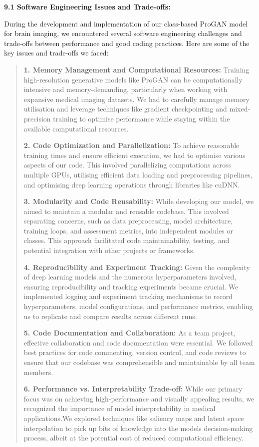\documentclass[
]{article}
\begin{document}
\textbf{9.1 Software Engineering Issues and Trade-offs:}

During the development and implementation of our class-based ProGAN
model for brain imaging, we encountered several software engineering
challenges and trade-offs between performance and good coding practices.
Here are some of the key issues and trade-offs we faced:

\begin{quote}
\textbf{1. Memory Management and Computational Resources:} Training
high-resolution generative models like ProGAN can be computationally
intensive and memory-demanding, particularly when working with expansive
medical imaging datasets. We had to carefully manage memory utilisation
and leverage techniques like gradient checkpointing and mixed-precision
training to optimise performance while staying within the available
computational resources.

\textbf{2. Code Optimization and Parallelization:} To achieve reasonable
training times and ensure efficient execution, we had to optimise
various aspects of our code. This involved parallelizing computations
across multiple GPUs, utilising efficient data loading and preprocessing
pipelines, and optimising deep learning operations through libraries
like cuDNN.

\textbf{3. Modularity and Code Reusability:} While developing our model,
we aimed to maintain a modular and reusable codebase. This involved
separating concerns, such as data preprocessing, model architecture,
training loops, and assessment metrics, into independent modules or
classes. This approach facilitated code maintainability, testing, and
potential integration with other projects or frameworks.

\textbf{4. Reproducibility and Experiment Tracking:} Given the
complexity of deep learning models and the numerous hyperparameters
involved, ensuring reproducibility and tracking experiments became
crucial. We implemented logging and experiment tracking mechanisms to
record hyperparameters, model configurations, and performance metrics,
enabling us to replicate and compare results across different runs.

\textbf{5. Code Documentation and Collaboration:} As a team project,
effective collaboration and code documentation were essential. We
followed best practices for code commenting, version control, and code
reviews to ensure that our codebase was comprehensible and maintainable
by all team members.

\textbf{6. Performance vs. Interpretability Trade-off:} While our
primary focus was on achieving high-performance and visually appealing
results, we recognized the importance of model interpretability in
medical applications.We explored techniques like saliency maps and
latent space interpolation to pick up bits of knowledge into the
model\textquotesingle s decision-making process, albeit at the potential
cost of reduced computational efficiency.


\end{quote}
\end{document}
